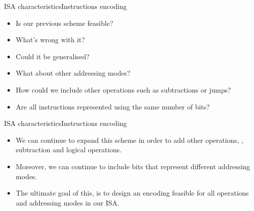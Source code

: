 \documentclass[]{slides}
\begin{document}
\begin{frame}{\acs{ISA} characteristics}{Instructions encoding}
  \begin{itemize}
    \item Is our previous scheme feasible?
    \item What's wrong with it?
	\item Could it be generalised?   
    \item What about other addressing modes?  
    \item How could we include other operations such as subtractions or jumps?
    \item Are all instructions represented using the same number of bits?
  \end{itemize}     
\end{frame}

\begin{frame}{\acs{ISA} characteristics}{Instructions encoding}
\begin{itemize}
\item We can continue to expand this scheme in order to add other operations, \eg, subtraction and logical operations.
\item Moreover, we can continue to include bits that represent different addressing modes.
\item The ultimate goal of this, is to design an encoding feasible for all operations and addressing modes in our \ac{ISA}.
\end{itemize} 
\end{frame}
\end{document}
